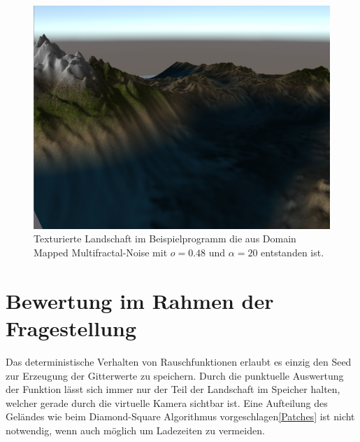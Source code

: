 \begin{figure}[!hbtp]
	\centering
	\includegraphics[width=\textwidth]{images/domainwarped_rendered.png}
	\caption{Texturierte Landschaft im Beispielprogramm die aus Domain Mapped Multifractal-Noise mit $o=0.48$ und $\alpha=20$ entstanden ist.}\label{img.domainwarpedRendered}
\end{figure}

\newpage
\section{Bewertung im Rahmen der Fragestellung}
Das deterministische Verhalten von Rauschfunktionen erlaubt es einzig den Seed zur Erzeugung der Gitterwerte zu speichern. Durch die punktuelle Auswertung der Funktion lässt sich immer nur der Teil der Landschaft im Speicher halten, welcher gerade durch die virtuelle Kamera sichtbar ist. Eine Aufteilung des Geländes wie beim Diamond-Square Algorithmus vorgeschlagen\ref{Patches} ist nicht notwendig, wenn auch möglich um Ladezeiten zu vermeiden.







